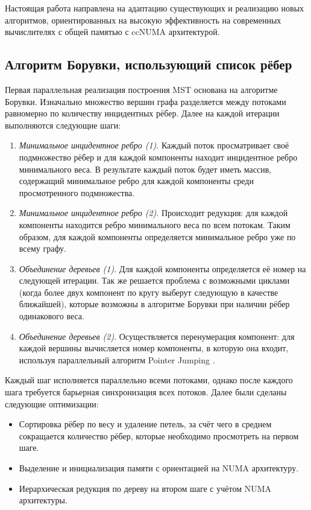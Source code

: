 \documentclass{article}
\begin{document}
Настоящая работа направлена на адаптацию существующих и реализацию новых алгоритмов, ориентированных на высокую эффективность на современных вычислителях с общей памятью с ccNUMA архитектурой.

\subsection{Алгоритм Борувки, использующий список рёбер}
Первая параллельная реализация построения MST основана на алгоритме Борувки. 
Изначально множество вершин графа разделяется между потоками равномерно по количеству инцидентных рёбер.
Далее на каждой итерации выполняются следующие шаги:
\begin{enumerate}
    \item \textit{Минимальное инцидентное ребро (1)}.
          Каждый поток просматривает своё подмножество рёбер и для каждой компоненты находит инцидентное ребро минимального веса. 
          В результате каждый поток будет иметь массив, содержащий минимальное ребро для каждой компоненты среди просмотренного подмножества.
    \item \textit{Минимальное инцидентное ребро (2)}.
          Происходит редукция: для каждой компоненты находится ребро минимального веса по всем потокам. 
          Таким образом, для каждой компоненты определяется минимальное ребро уже по всему графу.
    \item \textit{Объединение деревьев (1)}.
          Для каждой компоненты определяется её номер на следующей итерации.
          Так же решается проблема с возможными циклами (когда более двух компонент по кругу выберут следующую в качестве ближайшей), которые возможны в алгоритме Борувки при наличии рёбер одинакового веса.
    \item \textit{Объединение деревьев (2)}.
          Осуществляется перенумерация компонент: для каждой вершины вычисляется номер компоненты, в которую она входит, используя параллельный алгоритм Pointer Jumping \cite{pointer-jumping}.
\end{enumerate}
Каждый шаг исполняется параллельно всеми потоками, однако после каждого шага требуется барьерная синхронизация всех потоков.
Далее были сделаны следующие оптимизации:
\begin{itemize}
    \item Сортировка рёбер по весу и удаление петель, за счёт чего в среднем сокращается количество рёбер, которые необходимо просмотреть на первом шаге.
    \item Выделение и инициализация памяти с ориентацией на NUMA архитектуру.
    \item Иерархическая редукция по дереву на втором шаге с учётом NUMA архитектуры.
\end{itemize}
\end{document}
